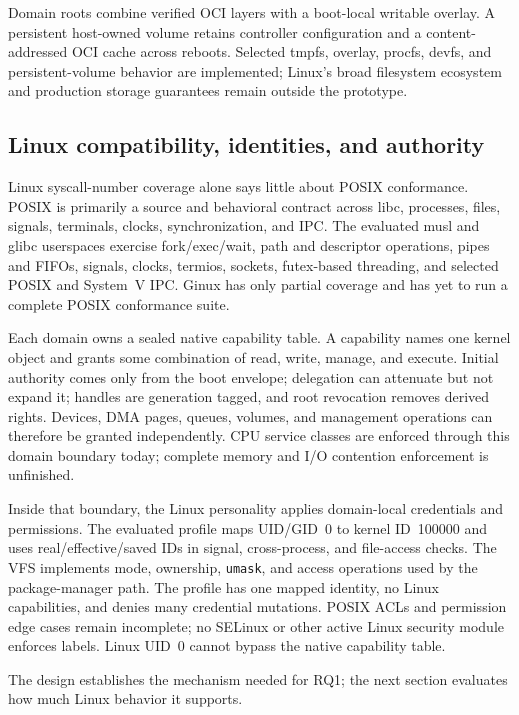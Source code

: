 \documentclass[11pt]{article}
\begin{document}
Domain roots combine verified OCI layers with a boot-local writable overlay. A
persistent host-owned volume retains controller configuration and a
content-addressed OCI cache across reboots. Selected tmpfs, overlay, procfs,
devfs, and persistent-volume behavior are implemented; Linux's broad
filesystem ecosystem and production storage guarantees remain outside the
prototype.

\subsection{Linux compatibility, identities, and authority}

Linux syscall-number coverage alone says little about POSIX conformance. POSIX is
primarily a source and behavioral contract across libc, processes, files,
signals, terminals, clocks, synchronization, and IPC. The evaluated musl and
glibc userspaces exercise fork/exec/wait, path and descriptor operations,
pipes and FIFOs, signals, clocks, termios, sockets, futex-based threading, and
selected POSIX and System~V IPC. Ginux has only partial coverage and has yet to
run a complete POSIX conformance suite.

Each domain owns a sealed native capability table. A capability names one
kernel object and grants some combination of read, write, manage, and execute.
Initial authority comes only from the boot envelope; delegation can attenuate
but not expand it; handles are generation tagged, and root revocation removes
derived rights. Devices, DMA pages, queues, volumes, and management operations
can therefore be granted independently. CPU service classes are enforced
through this domain boundary today; complete memory and I/O contention
enforcement is unfinished.

Inside that boundary, the Linux personality applies domain-local credentials
and permissions. The evaluated profile maps UID/GID~0 to kernel ID~100000 and
uses real/effective/saved IDs in signal, cross-process, and file-access checks.
The VFS implements mode, ownership, \texttt{umask}, and access operations used
by the package-manager path. The profile has one mapped identity, no Linux
capabilities, and denies many credential mutations. POSIX ACLs and permission
edge cases remain incomplete; no SELinux or other active Linux security module
enforces labels. Linux UID~0 cannot bypass the native capability table.

The design establishes the mechanism needed for RQ1; the next section evaluates
how much Linux behavior it supports.
\end{document}
